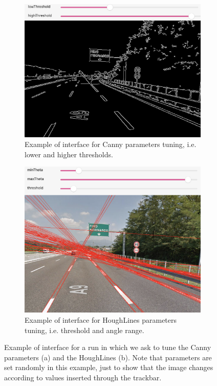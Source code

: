 \documentclass[twoside,onecolumn]{article}
\theoremstyle{definition}
\begin{document}
\begin{figure} \centering
\begin{subfigure}{0.5\textwidth}
  \includegraphics[width=\textwidth]{../results/tuningEdge.png}
\caption{ Example of interface for Canny parameters tuning, i.e. lower and higher thresholds.}\label{fig:tuningedge}
\end{subfigure} \quad
\begin{subfigure}{0.46\textwidth}
\includegraphics[width=\textwidth]{../results/tuningLines.png}
\caption{Example of interface for HoughLines parameters tuning, i.e. threshold and angle range.}\label{fig:tuningline}
\end{subfigure}\caption{Example of interface for a run in which we ask to tune the Canny parameters (a) and the HoughLines (b). Note that parameters are set randomly in this example, just to show that the image changes according to values inserted through the trackbar. }\label{fig:tuning}
\end{figure}
\end{document}
